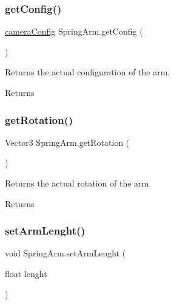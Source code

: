 \subsubsection{\texorpdfstring{get\+Config()}{getConfig()}}
{\footnotesize\ttfamily \mbox{\hyperlink{structcamera_config}{camera\+Config}} Spring\+Arm.\+get\+Config (\begin{DoxyParamCaption}{ }\end{DoxyParamCaption})}



Returns the actual configuration of the arm. 

\begin{DoxyReturn}{Returns}

\end{DoxyReturn}
\mbox{\label{class_spring_arm_ae6f57a311c474a058fce74a4450db6bf}} 
\subsubsection{\texorpdfstring{get\+Rotation()}{getRotation()}}
{\footnotesize\ttfamily Vector3 Spring\+Arm.\+get\+Rotation (\begin{DoxyParamCaption}{ }\end{DoxyParamCaption})}



Returns the actual rotation of the arm. 

\begin{DoxyReturn}{Returns}

\end{DoxyReturn}
\mbox{\label{class_spring_arm_acce988449ddf120825cc02b1dce3fb1c}} 
\subsubsection{\texorpdfstring{set\+Arm\+Lenght()}{setArmLenght()}}
{\footnotesize\ttfamily void Spring\+Arm.\+set\+Arm\+Lenght (\begin{DoxyParamCaption}\item[{float}]{lenght }\end{DoxyParamCaption})}



